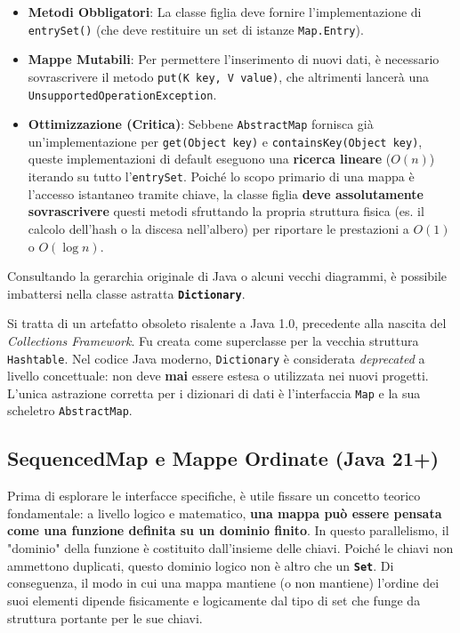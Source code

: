 \begin{itemize}
    \item \textbf{Metodi Obbligatori}: La classe figlia deve fornire l'implementazione di \texttt{entrySet()} (che deve restituire un set di istanze \texttt{Map.Entry}).
    \item \textbf{Mappe Mutabili}: Per permettere l'inserimento di nuovi dati, è necessario sovrascrivere il metodo \texttt{put(K key, V value)}, che altrimenti lancerà una \nolinkurl{UnsupportedOperationException}.
    \item \textbf{Ottimizzazione (Critica)}: Sebbene \texttt{AbstractMap} fornisca già un'implementazione per \texttt{get(Object key)} e \texttt{containsKey(Object key)}, queste implementazioni di default eseguono una \textbf{ricerca lineare} ($O(n)$) iterando su tutto l'\texttt{entrySet}. Poiché lo scopo primario di una mappa è l'accesso istantaneo tramite chiave, la classe figlia \textbf{deve assolutamente sovrascrivere} questi metodi sfruttando la propria struttura fisica (es. il calcolo dell'hash o la discesa nell'albero) per riportare le prestazioni a $O(1)$ o $O(\log n)$.
\end{itemize}

\begin{dettagli}
Consultando la gerarchia originale di Java o alcuni vecchi diagrammi, è possibile imbattersi nella classe astratta \textbf{\texttt{Dictionary}}. 

Si tratta di un artefatto obsoleto risalente a Java 1.0, precedente alla nascita del \textit{Collections Framework}. Fu creata come superclasse per la vecchia struttura \texttt{Hashtable}. Nel codice Java moderno, \texttt{Dictionary} è considerata \textit{deprecated} a livello concettuale: non deve \textbf{mai} essere estesa o utilizzata nei nuovi progetti. L'unica astrazione corretta per i dizionari di dati è l'interfaccia \texttt{Map} e la sua scheletro \texttt{AbstractMap}.
\end{dettagli}

\subsection{SequencedMap e Mappe Ordinate (Java 21+)}

Prima di esplorare le interfacce specifiche, è utile fissare un concetto teorico fondamentale: a livello logico e matematico, \textbf{una mappa può essere pensata come una funzione definita su un dominio finito}.
In questo parallelismo, il "dominio" della funzione è costituito dall'insieme delle chiavi. Poiché le chiavi non ammettono duplicati, questo dominio logico non è altro che un \textbf{\texttt{Set}}. Di conseguenza, il modo in cui una mappa mantiene (o non mantiene) l'ordine dei suoi elementi dipende fisicamente e logicamente dal tipo di set che funge da struttura portante per le sue chiavi.

